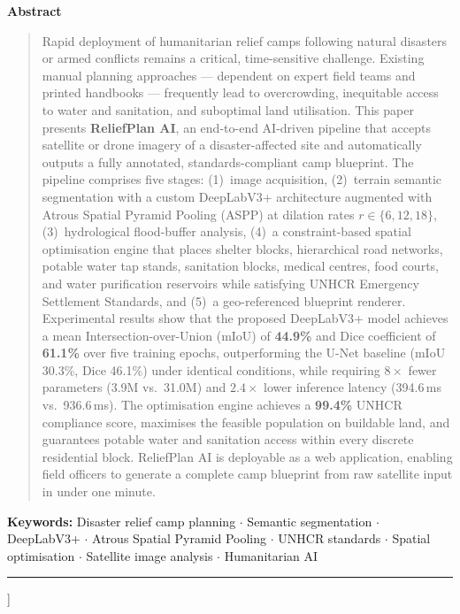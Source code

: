 \documentclass[twocolumn]{article}
\begin{document}
{\begin{@twocolumnfalse}
\begin{center}{\large\bfseries Abstract}\end{center}
\begin{quotation}\noindent
Rapid deployment of humanitarian relief camps following natural disasters or armed conflicts
remains a critical, time-sensitive challenge.
Existing manual planning approaches --- dependent on expert field teams and printed handbooks ---
frequently lead to overcrowding, inequitable access to water and sanitation, and suboptimal land
utilisation.
This paper presents \textbf{ReliefPlan AI}, an end-to-end AI-driven pipeline that accepts
satellite or drone imagery of a disaster-affected site and automatically outputs a fully annotated,
standards-compliant camp blueprint.
The pipeline comprises five stages:
(1)~image acquisition,
(2)~terrain semantic segmentation with a custom DeepLabV3+ architecture augmented with Atrous
Spatial Pyramid Pooling (ASPP) at dilation rates $r\in\{6,12,18\}$,
(3)~hydrological flood-buffer analysis,
(4)~a constraint-based spatial optimisation engine that places shelter blocks, hierarchical road
networks, potable water tap stands, sanitation blocks, medical centres, food courts, and water
purification reservoirs while satisfying UNHCR Emergency Settlement Standards, and
(5)~a geo-referenced blueprint renderer.
Experimental results show that the proposed DeepLabV3+ model achieves a mean
Intersection-over-Union (mIoU) of \textbf{44.9\%} and Dice coefficient of \textbf{61.1\%} over
five training epochs, outperforming the U-Net baseline (mIoU 30.3\%, Dice 46.1\%) under identical
conditions, while requiring $8{\times}$ fewer parameters (3.9M vs.\ 31.0M) and $2.4{\times}$ lower
inference latency (394.6\,ms vs.\ 936.6\,ms).
The optimisation engine achieves a \textbf{99.4\%} UNHCR compliance score, maximises the feasible
population on buildable land, and guarantees potable water and sanitation access within every
discrete residential block.
ReliefPlan AI is deployable as a web application, enabling field officers to generate a complete
camp blueprint from raw satellite input in under one minute.
\end{quotation}
\vspace{4pt}

\noindent\textbf{Keywords:}\;
Disaster relief camp planning $\cdot$
Semantic segmentation $\cdot$
DeepLabV3+ $\cdot$
Atrous Spatial Pyramid Pooling $\cdot$
UNHCR standards $\cdot$
Spatial optimisation $\cdot$
Satellite image analysis $\cdot$
Humanitarian AI

\vspace{8pt}
\hrule
\vspace{10pt}
\end{@twocolumnfalse}
}]
\end{document}
